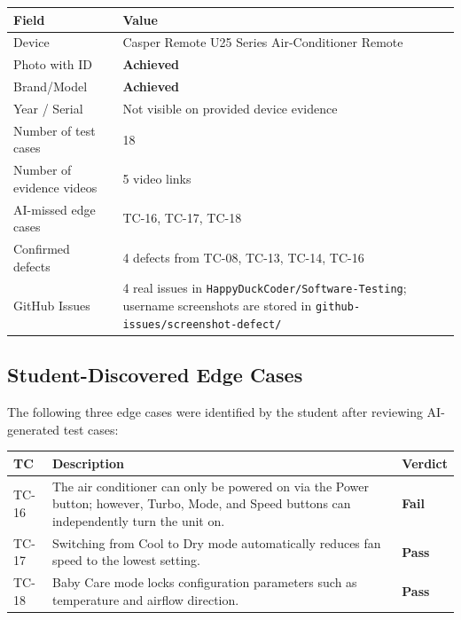 \documentclass[12pt, a4paper]{article}
\newcommand{\pass}{\textcolor{passgreen}{\textbf{Pass}}}
\newcommand{\fail}{\textcolor{failred}{\textbf{Fail}}}
\newcommand{\achieved}{\textcolor{passgreen}{\textbf{Achieved}}}
\begin{document}
\begin{table}[h!]
\centering
\begin{tabularx}{\textwidth}{L{4cm} X}
\toprule
\textbf{Field} & \textbf{Value} \\
\midrule
Device            & Casper Remote U25 Series Air-Conditioner Remote \\
Photo with ID     & \achieved \\
Brand/Model       & \achieved \\
Year / Serial     & Not visible on provided device evidence \\
Number of test cases  & 18 \\
Number of evidence videos & 5 video links \\
AI-missed edge cases  & TC-16, TC-17, TC-18 \\
Confirmed defects & 4 defects from TC-08, TC-13, TC-14, TC-16 \\
GitHub Issues & 4 real issues in \texttt{HappyDuckCoder/Software-Testing}; username screenshots are stored in \texttt{github-issues/screenshot-defect/} \\
\bottomrule
\end{tabularx}
\end{table}

\subsection{Student-Discovered Edge Cases}

The following three edge cases were identified by the student after reviewing AI-generated test cases:

\begin{table}[h!]
\centering
\begin{tabularx}{\textwidth}{C{1.5cm} X C{1.8cm}}
\toprule
\textbf{TC} & \textbf{Description} & \textbf{Verdict} \\
\midrule
TC-16 & The air conditioner can only be powered on via the Power button; however, Turbo, Mode, and Speed buttons can independently turn the unit on. & \fail \\
TC-17 & Switching from Cool to Dry mode automatically reduces fan speed to the lowest setting. & \pass \\
TC-18 & Baby Care mode locks configuration parameters such as temperature and airflow direction. & \pass \\
\bottomrule
\end{tabularx}
\end{table}
\end{document}
